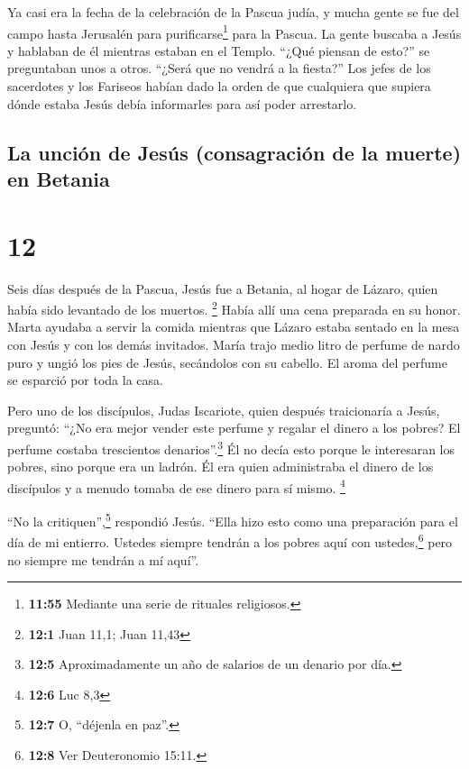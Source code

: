  Ya casi era la fecha de la celebración de la Pascua
judía, y mucha gente se fue del campo hasta Jerusalén para
purificarse\footnote{\textbf{11:55} Mediante una serie de rituales
  religiosos.} para la Pascua.  La gente buscaba a Jesús
y hablaban de él mientras estaban en el Templo. ``¿Qué piensan de
esto?'' se preguntaban unos a otros. ``¿Será que no vendrá a la
fiesta?''  Los jefes de los sacerdotes y los Fariseos
habían dado la orden de que cualquiera que supiera dónde estaba Jesús
debía informarles para así poder arrestarlo.

\hypertarget{la-unciuxf3n-de-jesuxfas-consagraciuxf3n-de-la-muerte-en-betania}{%
\subsection{La unción de Jesús (consagración de la muerte) en
Betania}\label{la-unciuxf3n-de-jesuxfas-consagraciuxf3n-de-la-muerte-en-betania}}

\hypertarget{section-11}{%
\section{12}\label{section-11}}

 Seis días después de la Pascua, Jesús fue a Betania, al
hogar de Lázaro, quien había sido levantado de los muertos. \footnote{\textbf{12:1}
  Juan 11,1; Juan 11,43}  Había allí una cena preparada en
su honor. Marta ayudaba a servir la comida mientras que Lázaro estaba
sentado en la mesa con Jesús y con los demás invitados. 
María trajo medio litro de perfume de nardo puro y ungió los pies de
Jesús, secándolos con su cabello. El aroma del perfume se esparció por
toda la casa.

 Pero uno de los discípulos, Judas Iscariote, quien
después traicionaría a Jesús, preguntó:  ``¿No era mejor
vender este perfume y regalar el dinero a los pobres? El perfume costaba
trescientos denarios''.\footnote{\textbf{12:5} Aproximadamente un año de
  salarios de un denario por día.}  Él no decía esto
porque le interesaran los pobres, sino porque era un ladrón. Él era
quien administraba el dinero de los discípulos y a menudo tomaba de ese
dinero para sí mismo. \footnote{\textbf{12:6} Luc 8,3}

 ``No la critiquen'',\footnote{\textbf{12:7} O, ``déjenla
  en paz''.} respondió Jesús. ``Ella hizo esto como una preparación para
el día de mi entierro.  Ustedes siempre tendrán a los
pobres aquí con ustedes,\footnote{\textbf{12:8} Ver Deuteronomio 15:11.}
pero no siempre me tendrán a mí aquí''.

